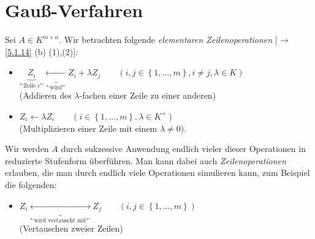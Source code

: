 \documentclass[../../main.tex]{subfiles}
\begin{document}
\section{Gauß-Verfahren}\label{5.2}

\begin{notsprbem}\label{5.2.1}
Sei $A\in K^{m\times n}$. Wir betrachten folgende \emph{elementaren Zeilenoperationen} {\rm[$\to$ \ref{5.1.14} (b) (1),(2)]}:
\begin{itemize}
\item
$\underbrace{Z_i}_\text{"`Zeile $i$"'}\underbrace{\leftarrow}_\text{"`wird"'} Z_i+\lambda Z_j
\qquad(i,j\in \left\{1,\ldots,m\right\}, i\neq j, \lambda\in K)$\\
(Addieren des $\lambda$-fachen einer Zeile zu einer anderen)
\item
$Z_i\leftarrow \lambda Z_i\qquad(i\in\left\{1,\ldots,m\right\},\lambda\in K^\times)$\\
(Multiplizieren einer Zeile mit einem $\lambda\neq 0$).
\end{itemize}
Wir werden $A$ durch sukzessive Anwendung endlich vieler dieser Operationen in reduzierte Stufenform überführen. Man kann dabei auch \emph{Zeilenoperationen} erlauben, die man durch endlich viele Operationen simulieren kann, zum Beispiel
die folgenden:
\begin{itemize}
\item$Z_i\underbrace{\leftrightarrow}_\text{"`wird vertauscht mit"'}Z_j\qquad(i,j\in\left\{1,\ldots,m\right\})$\\
(Vertauschen zweier Zeilen)\\
\end{itemize}
\end{notsprbem}
\end{document}

